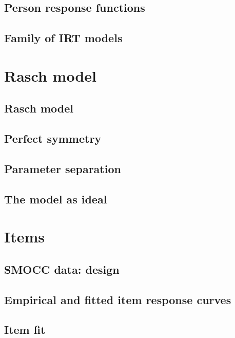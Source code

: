 \documentclass[]{book}
\begin{document}
\section{Person response functions}\label{person-response-functions}

\section{Family of IRT models}\label{family-of-irt-models}

\chapter{Rasch model}\label{rasch}

\section{Rasch model}\label{rasch-model}

\section{Perfect symmetry}\label{perfect-symmetry}

\section{Parameter separation}\label{parameter-separation}

\section{The model as ideal}\label{the-model-as-ideal}

\chapter{Items}\label{items}

\section{SMOCC data: design}\label{smocc-data-design}

\section{Empirical and fitted item response
curves}\label{empirical-and-fitted-item-response-curves}

\section{Item fit}\label{item-fit}
\end{document}
